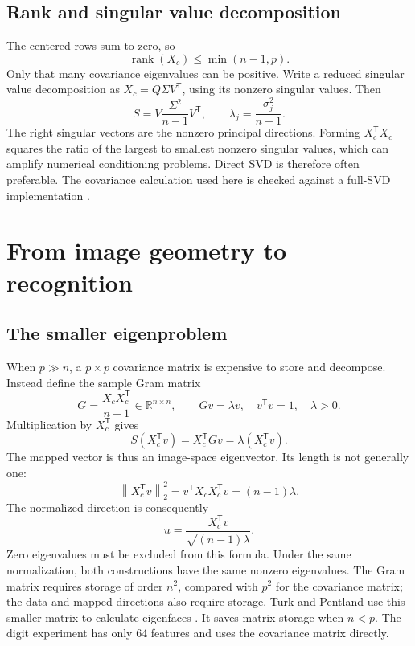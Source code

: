 \documentclass[11pt,a4paper,english]{article}
\numberwithin{equation}{section}
\DeclareMathOperator{\rank}{rank}
\newcommand{\R}{\mathbb{R}}
\newcommand{\norm}[1]{\left\lVert#1\right\rVert}
\newcommand{\T}{^{\mathsf T}}
\begin{document}
\subsection{Rank and singular value decomposition}
The centered rows sum to zero, so
\begin{equation}
\rank(X_c)\leq\min(n-1,p).
\end{equation}
Only that many covariance eigenvalues can be positive. Write a reduced singular value decomposition as $X_c=Q\Sigma V\T$, using its nonzero singular values. Then
\begin{equation}
S=V\frac{\Sigma^2}{n-1}V\T,
\qquad \lambda_j=\frac{\sigma_j^2}{n-1}.
\label{eq:svd}
\end{equation}
The right singular vectors are the nonzero principal directions. Forming $X_c\T X_c$ squares the ratio of the largest to smallest nonzero singular values, which can amplify numerical conditioning problems. Direct SVD is therefore often preferable. The covariance calculation used here is checked against a full-SVD implementation \cite{sklearnpca}.

\section{From image geometry to recognition}
\subsection{The smaller eigenproblem}
When $p\gg n$, a $p\times p$ covariance matrix is expensive to store and decompose. Instead define the sample Gram matrix
\begin{equation}
G=\frac{X_cX_c\T}{n-1}\in\R^{n\times n},
\qquad Gv=\lambda v,\quad v\T v=1,\quad\lambda>0.
\label{eq:gram}
\end{equation}
Multiplication by $X_c\T$ gives
\begin{equation}
S(X_c\T v)
=X_c\T Gv=\lambda(X_c\T v).
\end{equation}
The mapped vector is thus an image-space eigenvector. Its length is not generally one:
\begin{equation}
\norm{X_c\T v}_2^2=v\T X_cX_c\T v=(n-1)\lambda.
\end{equation}
The normalized direction is consequently
\begin{equation}
u=\frac{X_c\T v}{\sqrt{(n-1)\lambda}}.
\label{eq:dualnormalize}
\end{equation}
Zero eigenvalues must be excluded from this formula. Under the same normalization, both constructions have the same nonzero eigenvalues. The Gram matrix requires storage of order $n^2$, compared with $p^2$ for the covariance matrix; the data and mapped directions also require storage. Turk and Pentland use this smaller matrix to calculate eigenfaces \cite[pp.~74--75]{turk}. It saves matrix storage when $n<p$. The digit experiment has only 64 features and uses the covariance matrix directly.
\end{document}
